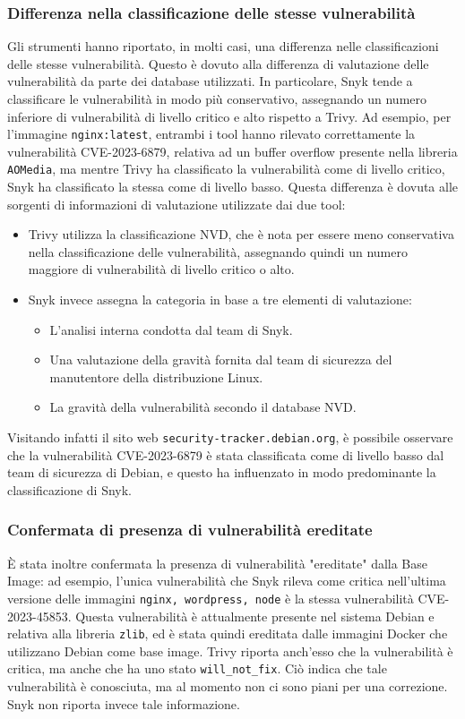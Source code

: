 \subsubsection{Differenza nella classificazione delle stesse vulnerabilità}
Gli strumenti hanno riportato, in molti casi, una differenza nelle classificazioni delle stesse vulnerabilità. Questo è dovuto alla differenza di valutazione delle vulnerabilità da parte dei database utilizzati. In particolare, Snyk tende a classificare le vulnerabilità in modo più conservativo, assegnando un numero inferiore di vulnerabilità di livello critico e alto rispetto a Trivy. Ad esempio, per l'immagine \texttt{nginx:latest}, entrambi i tool hanno rilevato correttamente la vulnerabilità CVE-2023-6879, relativa ad un buffer overflow presente nella libreria \texttt{AOMedia}, ma mentre Trivy ha classificato la vulnerabilità come di livello critico, Snyk ha classificato la stessa come di livello basso. Questa differenza è dovuta alle sorgenti di informazioni di valutazione utilizzate dai due tool:
\begin{itemize}
   \item Trivy utilizza la classificazione NVD, che è nota per essere meno conservativa nella classificazione delle vulnerabilità, assegnando quindi un numero maggiore di vulnerabilità di livello critico o alto.
   \item Snyk invece assegna la categoria in base a tre elementi di valutazione:
         \begin{itemize}
            \item L'analisi interna condotta dal team di Snyk.
            \item Una valutazione della gravità fornita dal team di sicurezza del manutentore della distribuzione Linux.
            \item La gravità della vulnerabilità secondo il database NVD.
         \end{itemize}
\end{itemize}
Visitando infatti il sito web \texttt{security-tracker.debian.org}, è possibile osservare che la vulnerabilità CVE-2023-6879 è stata classificata come di livello basso dal team di sicurezza di Debian, e questo ha influenzato in modo predominante la classificazione di Snyk.
\subsubsection{Confermata di presenza di vulnerabilità ereditate}
È stata inoltre confermata la presenza di vulnerabilità "ereditate" dalla Base Image: ad esempio, l'unica vulnerabilità che Snyk rileva come critica nell'ultima versione delle immagini \texttt{nginx, wordpress, node} è la stessa vulnerabilità CVE-2023-45853. Questa vulnerabilità è attualmente presente nel sistema Debian e relativa alla libreria \texttt{zlib}, ed è stata quindi ereditata dalle immagini Docker che utilizzano Debian come base image.
Trivy riporta anch'esso che la vulnerabilità è critica, ma anche che ha uno stato \texttt{will\_not\_fix}. Ciò indica che tale vulnerabilità è conosciuta, ma al momento non ci sono piani per una correzione. Snyk non riporta invece tale informazione.


